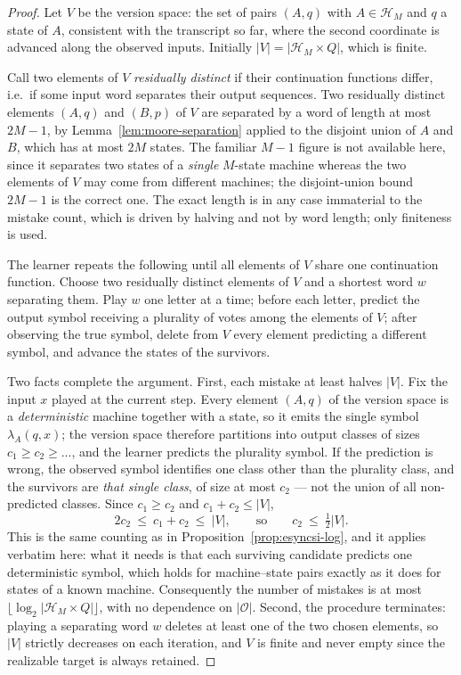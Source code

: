 \documentclass[12pt]{article}
\theoremstyle{definition}
\begin{document}
\begin{proof}
Let $V$ be the version space: the set of pairs $(A,q)$ with
$A\in\mathcal H_M$ and $q$ a state of $A$, consistent with the transcript so
far, where the second coordinate is advanced along the observed inputs.
Initially $|V|=|\mathcal H_M\times Q|$, which is finite.

Call two elements of $V$ \emph{residually distinct} if their continuation
functions differ, i.e.\ if some input word separates their output sequences.
Two residually distinct elements $(A,q)$ and $(B,p)$ of $V$ are separated by a
word of length at most $2M-1$, by Lemma~\ref{lem:moore-separation} applied to
the disjoint union of $A$ and $B$, which has at most $2M$ states.  The familiar
$M-1$ figure is not available here, since it separates two states of a
\emph{single} $M$-state machine whereas the two elements of $V$ may come from
different machines; the disjoint-union bound $2M-1$ is the correct one.  The
exact length is in any case immaterial to the mistake count, which is driven by
halving and not by word length; only finiteness is used.

The learner repeats the following until all elements of $V$ share one
continuation function.  Choose two residually distinct elements of $V$ and a
shortest word $w$ separating them.  Play $w$ one letter at a time; before each
letter, predict the output symbol receiving a plurality of votes among the
elements of $V$; after observing the true symbol, delete from $V$ every element
predicting a different symbol, and advance the states of the survivors.

Two facts complete the argument.  First, each mistake at least halves $|V|$.
Fix the input $x$ played at the current step.  Every element $(A,q)$ of the
version space is a \emph{deterministic} machine together with a state, so it
emits the single symbol $\lambda_A(q,x)$; the version space therefore
partitions into output classes of sizes $c_1\ge c_2\ge\dots$, and the learner
predicts the plurality symbol.  If the prediction is wrong, the observed symbol
identifies one class other than the plurality class, and the survivors are
\emph{that single class}, of size at most $c_2$ --- not the union of all
non-predicted classes.  Since $c_1\ge c_2$ and $c_1+c_2\le|V|$,
\[
2c_2\ \le\ c_1+c_2\ \le\ |V|,
\qquad\text{so}\qquad
c_2\ \le\ \tfrac12|V| .
\]
This is the same counting as in Proposition~\ref{prop:esyncsi-log}, and it
applies verbatim here: what it needs is that each surviving candidate predicts
one deterministic symbol, which holds for machine--state pairs exactly as it
does for states of a known machine.  Consequently the number of mistakes is at
most $\bigl\lfloor\log_2|\mathcal H_M\times Q|\bigr\rfloor$, with no dependence
on $|\mathcal O|$.  Second, the procedure terminates:
playing a separating word $w$ deletes at least one of the two chosen elements,
so $|V|$ strictly decreases on each iteration, and $V$ is finite and never
empty since the realizable target is always retained.


\end{proof}
\end{document}
